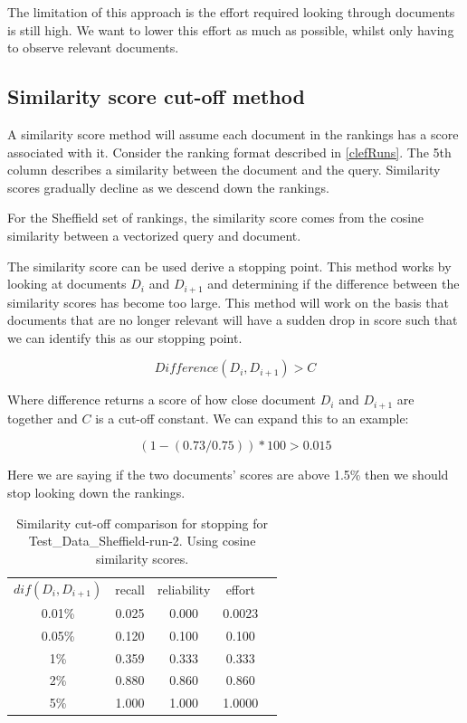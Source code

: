The limitation of this approach is the effort required looking through documents is still high. We want to lower this effort as much as possible, whilst only having to observe relevant documents.


\subsection{Similarity score cut-off method} \label{simScoreMethod}

A similarity score method will assume each document in the rankings has a score associated with it. Consider the ranking format described in \ref{clefRuns}. The 5th column describes a similarity between the document and the query. Similarity scores gradually decline as we descend down the rankings.


For the Sheffield set of rankings, the similarity score comes from the cosine similarity between a vectorized query and document. 

The similarity score can be used derive a stopping point. This method works by looking at documents $D_i$ and $D_{i+1}$ and determining if the difference between the similarity scores has become too large. This method will work on the basis that documents that are no longer relevant will have a sudden drop in score such that we can identify this as our stopping point.

\begin{equation}
	  Difference(D_i, D_{i+1}) > C
\end{equation}

Where difference returns a score of how close document $D_i$ and $D_{i+1}$ are together and $C$ is a cut-off constant. We can expand this to an example:

\begin{equation}
	  (1 -(0.73 / 0.75)) * 100 > 0.015
\end{equation}

Here we are saying if the two documents' scores are above 1.5\% then we should stop looking down the rankings.


\begin{table}[H]
\centering
\begin{tabular}{|c|c|c|c|c|} 
\hline
 $dif(D_i, D_{i+1})$ & recall & reliability & effort  \\ 
 0.01\% & 0.025 &	0.000	&	0.0023 \\ 
 0.05\% & 0.120 &	0.100	&	0.100 \\ 
 1\% & 0.359 &	0.333	&	0.333 \\ 
 2\% & 0.880 &	0.860	&	0.860 \\ 
 5\% & 1.000 &	1.000	&	1.0000 \\ 
 \hline
\end{tabular}

\caption{Similarity cut-off comparison for stopping for Test\_Data\_Sheffield-run-2. Using cosine similarity scores.}
\end{table}

